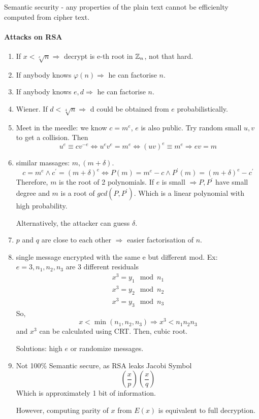 \begin{definition}
	Semantic security - any properties of the plain text cannot be efficienlty computed from cipher text.
\end{definition}

\paragraph{Attacks on RSA}
\begin{enumerate}
	\item If $x < \sqrt[e]{n} \Rightarrow$ decrypt is e-th root in $\operatorname{\mathbb{Z}}_n$, not that hard.
	\item If anybody knows $\varphi(n) \Rightarrow$ he can factorise $n$.
	\item If anybody knows $e,d \Rightarrow$ he can factorise $n$.
	\item Wiener. If $d < \sqrt[4]{n} \Rightarrow$ d could be obtained from $e$ probabilistically.
	\item Meet in the meedle: we know $c = m^e$, $e$ is also public. Try random small $u, v$ to get a collision.
		Then
		\[ u^e \equiv c v^{-e} \iff u^e v^e = m^e \iff (uv)^e \equiv m^e \Rightarrow ev = m \]
	\item similar massages: $m, (m + \delta)$.
		\[ c = m^e \land c^{\prime} = (m + \delta)^e \iff P(m) = m^e - c \land P^{\prime}(m) = (m + \delta)^e - c^{\prime} \]
			Therefore, $m$ is the root of 2 polynomials.
			If $e$ is small $\Rightarrow P, P^{\prime}$ have small degree and $m$ is a root of $gcd(P, P^{\prime})$.
			Which is a linear polynomial with high probability.

			Alternatively, the attacker can guess $\delta$.
	\item $p$ and $q$ are close to each other $\Rightarrow$ easier factorisation of $n$.
	\item single message encrypted with the same e but different mod.
		Ex: $e = 3, n_1, n_2, n_3$ are 3 different residuals
		\begin{gather*}
			x^3 = y_1 \mod n_1\\
			x^3 = y_2 \mod n_2\\
			x^3 = y_3 \mod n_3
		\end{gather*}
		So, \[x < \min(n_1, n_2, n_3) \Rightarrow x^3 < n_1n_2n_3\] and $x^3$ can be calculated using CRT. Then, cubic root.

		Solutions: high $e$ or randomize messages.
	\item Not 100\% Semantic secure, as RSA leaks Jacobi Symbol
		\[ \left(\frac{x}{p}\right) \left(\frac{x}{q}\right) \]
		Which is approximately 1 bit of information.

	However, computing parity of $x$ from $E(x)$ is equivalent to full decryption.
\end{enumerate}

